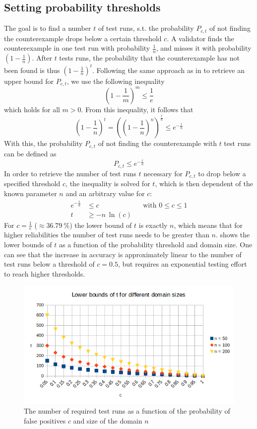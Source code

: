 \subsection{Setting probability thresholds}\label{sec:prob_threshold}
The goal is to find a number $t$ of test runs, s.t. the probability $P_{c,t}$ of not finding the counterexample drops below a certain threshold $c$. A validator finds the counterexample in one test run with probability $\frac{1}{n}$, and misses it with probability $(1-\frac{1}{n})$. After $t$ tests runs, the probability that the counterexample has not been found is thus $(1-\frac{1}{n})^t$. Following the same approach as in \cite{mahl_schindel_2007} to retrieve an upper bound for $P_{c,t}$, we use the following inequality
\begin{equation}
(1-\frac{1}{m})^m \leq \frac{1}{e}
\end{equation}
which holds for all $m > 0$. From this inequality, it follows that
\begin{equation}
(1-\frac{1}{n})^t = ((1-\frac{1}{n})^n)^{\frac{t}{n}} \le e^{-\frac{t}{n}}
\end{equation}
With this, the probability $P_{c,t}$ of not finding the counterexample with $t$ test runs can be defined as
\begin{equation}
P_{c,t} \le e^{-\frac{t}{n}}
\end{equation}
In order to retrieve the number of test runs $t$ necessary for $P_{c,t}$ to drop below a specified threshold $c$, the inequality is solved for $t$, which is then dependent of the known parameter $n$ and an arbitrary value for $c$:
\begin{align}
    e^{-\frac{t}{n}} &\leq c && \text{with } 0 \leq c\le 1 \nonumber\\
    t &\geq -n\:\ln(c)
\end{align}
For $c = \frac{1}{e}$ ($\approx 36.79\:\%$) the lower bound of $t$ is exactly $n$, which means that for higher reliabilities the number of test runs needs to be greater than $n$.  shows the lower bounds of $t$ as a function of the probability threshold and domain size. One can see that the increase in accuracy is approximately linear to the number of test runs below a threshold of $c=0.5$, but requires an exponential testing effort to reach higher thresholds.
\begin{figure}[h]
\includegraphics[width=0.95\linewidth]{figures/3-offline/graph_t_c}
\caption{The number of required test runs as a function of the probability of false positives $c$ and size of the domain $n$}
\label{fig:graph_t_c}
\end{figure}
